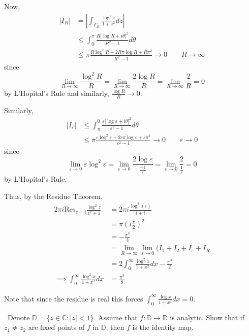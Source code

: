 \documentclass[12pt]{Homework}
\newcommand{\res}{\text{Res}}
\begin{document}
\begin{solution}
Now, \begin{align*}
    |I_R|&=\left|\int_{\Gamma_R}\frac{\log^2 z}{1+z^2}dz\right|\\
    &\le\int_0^\pi\frac{R|\log R+i\theta|^2}{R^2-1}d\theta\\
    &\le \pi\frac{R\log^2 R+2R\pi\log R+R\pi^2}{R^2-1}\to0\qquad R\to\infty
\end{align*}
 since $$\lim_{R\to\infty}\frac{\log^2R}{R}=\lim_{R\to\infty}\frac{2\log R}{R}=\lim_{R\to\infty}\frac{2}{R}=0$$ by L'Hopital's Rule and similarly, $\frac{\log R}{R}\to0$.
 
 Similarly, \begin{align*}
     |I_\varepsilon|&\le \int_\pi^0\frac{\varepsilon|\log\varepsilon+i\theta|^2}{\varepsilon^2-1}d\theta\\
     &\le \pi\frac{\varepsilon\log^2 \varepsilon+2\varepsilon\pi\log \varepsilon+\varepsilon\pi^2}{\varepsilon^2-1}\to0\qquad \varepsilon\to0
 \end{align*} since $$\lim_{\varepsilon\to0}\varepsilon\log^2\varepsilon=\lim_{\varepsilon\to0}\frac{2\log \varepsilon}{\frac{-1}{\varepsilon}}=\lim_{\varepsilon\to0}\frac{2}{\frac{1}{\varepsilon}}=0$$ by L'Hopital's Rule.
 
 Thus, by the Residue Theorem, \begin{align*}
     2\pi i\res_{z=i}\frac{\log^2 z}{z^2+1}&=2\pi i\frac{\log^2(i)}{i+i}\\
     &=\pi\left(i\frac{\pi}{2}\right)^2\\
     &=-\frac{\pi^3}{4}\\
     &=\lim_{R\to\infty}\lim_{\varepsilon\to0}(I_1+I_2+I_\varepsilon+I_R\\
     &=2\int_0^\infty\frac{\log^2 x}{1+x^2}dx-\frac{\pi^3}{2}\\
     \implies \int_0^\infty\frac{\log^2 x}{1+x^2}dx&=\frac{\pi^3}{8}
 \end{align*}
 
Note that since the residue is real this forces $\displaystyle \int_0^\infty\frac{\log x}{1+x^2}dx=0$.
\end{solution}
\newpage





\begin{problem} $\,$
Denote $\mathbb{D}=\{z\in\mathbb{C}:|z|<1\}.$ Assume that $f:\mathbb{D}\to\mathbb{D}$ is analytic. Show that if $z_1\not=z_2$ are fixed points of $f$ in $\mathbb{D}$, then $f$ is the identity map. 
\end{problem}
\end{document}
